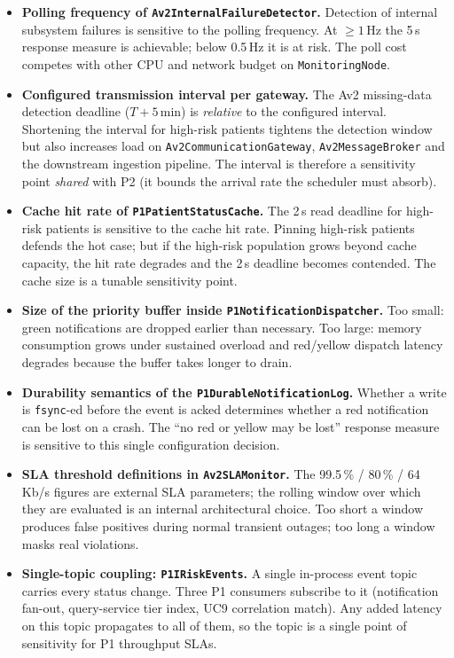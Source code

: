 \begin{itemize}
  \item \textbf{Polling frequency of
        \texttt{Av2InternalFailureDetector}.}
        Detection of internal subsystem failures is sensitive to the
        polling frequency. At $\geq 1$\,Hz the 5\,s response measure is
        achievable; below 0.5\,Hz it is at risk. The poll cost competes
        with other CPU and network budget on \texttt{MonitoringNode}.
  \item \textbf{Configured transmission interval per gateway.}
        The Av2 missing-data detection deadline ($T{+}5$\,min) is
        \emph{relative} to the configured interval. Shortening the
        interval for high-risk patients tightens the detection window
        but also increases load on \texttt{Av2CommunicationGateway},
        \texttt{Av2MessageBroker} and the downstream ingestion pipeline.
        The interval is therefore a sensitivity point \emph{shared} with
        P2 (it bounds the arrival rate the scheduler must absorb).
  \item \textbf{Cache hit rate of \texttt{P1PatientStatusCache}.}
        The 2\,s read deadline for high-risk patients is sensitive to
        the cache hit rate. Pinning high-risk patients defends the hot
        case; but if the high-risk population grows beyond cache
        capacity, the hit rate degrades and the 2\,s deadline becomes
        contended. The cache size is a tunable sensitivity point.
  \item \textbf{Size of the priority buffer inside
        \texttt{P1NotificationDispatcher}.}
        Too small: green notifications are dropped earlier than
        necessary. Too large: memory consumption grows under sustained
        overload and red/yellow dispatch latency degrades because the
        buffer takes longer to drain.
  \item \textbf{Durability semantics of the
        \texttt{P1DurableNotificationLog}.}
        Whether a write is \texttt{fsync}-ed before the event is acked
        determines whether a red notification can be lost on a crash.
        The ``no red or yellow may be lost'' response measure is
        sensitive to this single configuration decision.
  \item \textbf{SLA threshold definitions in \texttt{Av2SLAMonitor}.}
        The 99.5\,\% / 80\,\% / 64\,Kb/s figures are external SLA
        parameters; the rolling window over which they are evaluated is
        an internal architectural choice. Too short a window produces
        false positives during normal transient outages; too long a
        window masks real violations.
  \item \textbf{Single-topic coupling: \texttt{P1IRiskEvents}.}
        A single in-process event topic carries every status change.
        Three P1 consumers subscribe to it (notification fan-out,
        query-service tier index, UC9 correlation match). Any added
        latency on this topic propagates to all of them, so the topic
        is a single point of sensitivity for P1 throughput SLAs.
\end{itemize}

